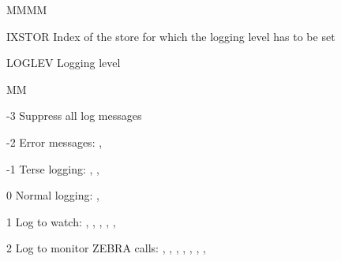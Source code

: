 \begin{DL}{MMMM}
\item[IXSTOR]Index of the store
for which the logging level has to be set
\item[LOGLEV]Logging level
\begin{DL}{MM}
\item[-3]Suppress all log messages
\item[-2]Error messages: , 
\item[-1]Terse logging: , , 
\item[ 0]Normal logging: , 
\item[ 1]Log to watch: , , , 
, , 
\item[ 2]Log to monitor ZEBRA calls: ,
, , , ,
, , 
\end{DL}
\end{DL}
